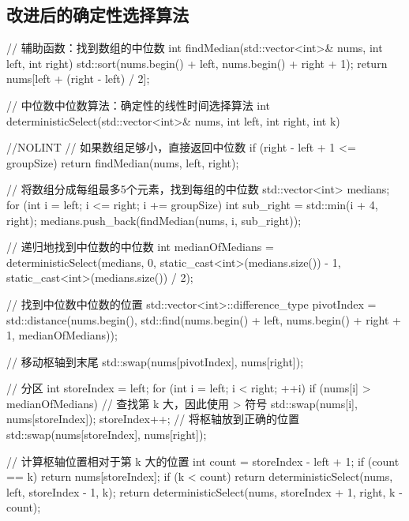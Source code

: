 \subsection{改进后的确定性选择算法}
\begin{cppcode}
// 辅助函数：找到数组的中位数
int findMedian(std::vector<int>& nums, int left, int right) {
    std::sort(nums.begin() + left, nums.begin() + right + 1);
    return nums[left + (right - left) / 2];
}

// 中位数中位数算法：确定性的线性时间选择算法
int deterministicSelect(std::vector<int>& nums, int left, int right, int k) { //NOLINT
    // 如果数组足够小，直接返回中位数
    if (right - left + 1 <= groupSize) {
        return findMedian(nums, left, right);
    }

    // 将数组分成每组最多5个元素，找到每组的中位数
    std::vector<int> medians;
    for (int i = left; i <= right; i += groupSize) {
        int sub_right = std::min(i + 4, right);
        medians.push_back(findMedian(nums, i, sub_right));
    }

    // 递归地找到中位数的中位数
    int medianOfMedians = deterministicSelect(medians, 0, static_cast<int>(medians.size()) - 1, static_cast<int>(medians.size()) / 2);

    // 找到中位数中位数的位置
    std::vector<int>::difference_type pivotIndex = std::distance(nums.begin(), std::find(nums.begin() + left, nums.begin() + right + 1, medianOfMedians));

    // 移动枢轴到末尾
    std::swap(nums[pivotIndex], nums[right]);

    // 分区
    int storeIndex = left;
    for (int i = left; i < right; ++i) {
        if (nums[i] > medianOfMedians) { // 查找第 k 大，因此使用 > 符号
            std::swap(nums[i], nums[storeIndex]);
            storeIndex++;
        }
    }
    // 将枢轴放到正确的位置
    std::swap(nums[storeIndex], nums[right]);

    // 计算枢轴位置相对于第 k 大的位置
    int count = storeIndex - left + 1;
    if (count == k) {
        return nums[storeIndex];
    }
    if (k < count) {
        return deterministicSelect(nums, left, storeIndex - 1, k);
    }
    return deterministicSelect(nums, storeIndex + 1, right, k - count);
}
\end{cppcode}
